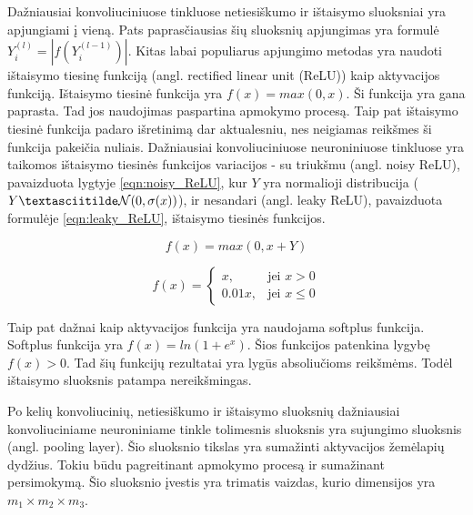 Dažniausiai konvoliuciniuose tinkluose netiesiškumo ir ištaisymo sluoksniai yra apjungiami į vieną. Pats paprasčiausias šių sluoksnių apjungimas yra formulė  $Y_i^{(l)} = |f(Y_i^{(l - 1)})|$. Kitas labai populiarus apjungimo metodas yra naudoti ištaisymo tiesinę funkciją (angl. rectified linear unit (ReLU)) kaip aktyvacijos funkciją. Ištaisymo tiesinė funkcija yra $f(x) = max(0, x)$. Ši funkcija yra gana paprasta. Tad jos naudojimas paspartina apmokymo procesą. Taip pat ištaisymo tiesinė funkcija padaro išretinimą dar aktualesniu, nes neigiamas reikšmes ši funkcija pakeičia nuliais. Dažniausiai konvoliuciniuose neuroniniuose tinkluose yra taikomos ištaisymo tiesinės funkcijos variacijos - su triukšmu (angl. noisy ReLU), pavaizduota lygtyje \ref{eqn:noisy_ReLU}, kur $Y$ yra normalioji distribucija ($Y \textasciitilde \mathcal{N}(0, \sigma(x))$), ir nesandari (angl. leaky ReLU), pavaizduota formulėje \ref{eqn:leaky_ReLU},  ištaisymo tiesinės funkcijos.

\begin{equation}
\label{eqn:noisy_ReLU}
	f(x) = max(0, x + Y)
\end{equation}

\begin{equation}
\label{eqn:leaky_ReLU}
	f(x) = 
	\begin{cases}
	x, & \mbox{jei } x > 0 \\
	0.01x, & \mbox{jei } x \leq 0
	\end{cases}
\end{equation}

Taip pat dažnai kaip aktyvacijos funkcija yra naudojama softplus funkcija. Softplus funkcija yra $f(x) = ln(1 + e^x)$. Šios funkcijos patenkina lygybę $f(x) > 0$. Tad šių funkcijų rezultatai yra lygūs absoliučioms reikšmėms. Todėl ištaisymo sluoksnis patampa nereikšmingas.

Po kelių konvoliucinių, netiesiškumo ir ištaisymo sluoksnių dažniausiai konvoliuciniame neuroniniame tinkle tolimesnis sluoksnis yra sujungimo sluoksnis (angl. pooling layer). Šio sluoksnio tikslas yra sumažinti aktyvacijos žemėlapių dydžius. Tokiu būdu pagreitinant apmokymo procesą ir sumažinant persimokymą. Šio sluoksnio įvestis yra trimatis vaizdas, kurio dimensijos yra $m_1 \times m_2 \times m_3$.